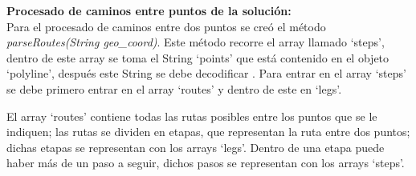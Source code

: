 \vspace{0.06in}
\textbf{Procesado de caminos entre puntos de la solución:}\\
Para el procesado de caminos entre dos puntos se creó el método \textit{parseRoutes(String geo\_coord)}. Este método recorre el array llamado \enquote*{steps}, dentro de este array se toma el String \enquote*{points} que está contenido en el objeto \enquote*{polyline}, después este String se debe decodificar \cite{decode_polyline}. Para entrar en el array \enquote*{steps} se debe primero entrar en el array \enquote*{routes} y dentro de este en \enquote*{legs}.\newline

El array \enquote*{routes} contiene todas las rutas posibles entre los puntos que se le indiquen; las rutas se dividen en etapas, que representan la ruta entre dos puntos; dichas etapas se representan con los arrays \enquote*{legs}. Dentro de una etapa puede haber más de un paso a seguir, dichos pasos se representan con los arrays \enquote*{steps}.\newline

